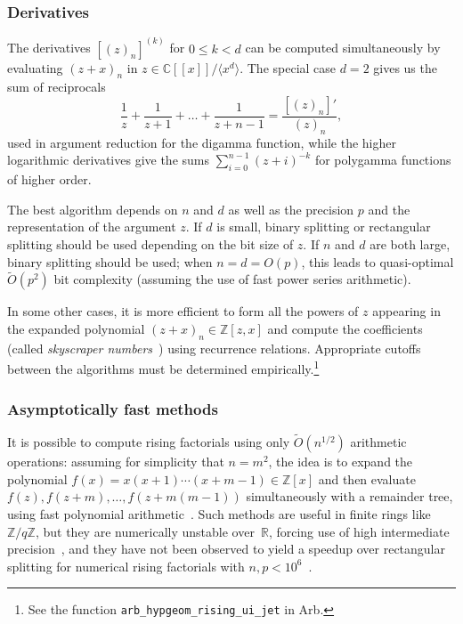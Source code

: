 \documentclass[reqno]{amsart}
\newcommand{\ZZ}{\mathbb{Z}}
\newcommand{\RR}{\mathbb{R}}
\newcommand{\CC}{\mathbb{C}}
\newcommand{\bigOtilde}{\widetilde O}
\theoremstyle{definition}
\begin{document}
\subsubsection{Derivatives}

The derivatives $[(z)_n]^{(k)}$ for $0 \le k < d$ can be computed simultaneously
by evaluating $(z + x)_n$ in $z \in \CC[[x]] / \langle x^d \rangle$.
The special case $d = 2$ gives us the sum of reciprocals
\begin{equation}
\frac{1}{z} + \frac{1}{z+1} + \ldots + \frac{1}{z+n-1} = \frac{[(z)_n]'}{(z)_n},
\end{equation}
used in argument reduction for the digamma function,
while the higher logarithmic derivatives give the sums $\sum_{i=0}^{n-1} (z+i)^{-k}$
for polygamma functions of higher order.

The best algorithm depends on $n$ and $d$ as well as the precision $p$
and the representation of the argument $z$.
If $d$ is small, binary splitting or rectangular splitting
should be used depending on the bit size of $z$.
If $n$ and $d$ are both large, binary splitting should be used;
when $n = d = O(p)$, this leads to quasi-optimal
$\bigOtilde(p^2)$ bit complexity (assuming the use of fast power series arithmetic).

In some other cases, it is more efficient to form all the powers of $z$
appearing in the expanded polynomial $(z + x)_n \in \ZZ[z,x]$
and compute the coefficients (called \emph{skyscraper numbers}~\cite{khovanova2013skyscraper}) using recurrence relations.
Appropriate cutoffs between the algorithms must be determined empirically.\footnote{See the function \texttt{arb\_hypgeom\_rising\_ui\_jet} in Arb.}

\subsubsection{Asymptotically fast methods}

It is possible to compute rising factorials using
only $\bigOtilde(n^{1/2})$
arithmetic operations: assuming for simplicity that
$n = m^2$, the idea is to expand the polynomial
$f(x) = x (x+1) \cdots (x+m-1) \in \ZZ[x]$
and then evaluate $f(z), f(z+m), \ldots, f(z+m(m-1))$
simultaneously with a remainder tree,
using fast polynomial arithmetic~\cite{Strassen1976,ChudnovskyChudnovsky1988,Ziegler2005,BostanGaudrySchost2007}.
Such methods are useful in finite rings like $\ZZ / q \ZZ$,
but they are numerically unstable over~$\RR$,
forcing use of high intermediate precision~\cite{KohlerZiegler2008},
and they have not been observed to yield a speedup
over rectangular splitting for
numerical rising factorials with $n, p < 10^6$~\cite{Johansson2014rectangular}.
\end{document}

